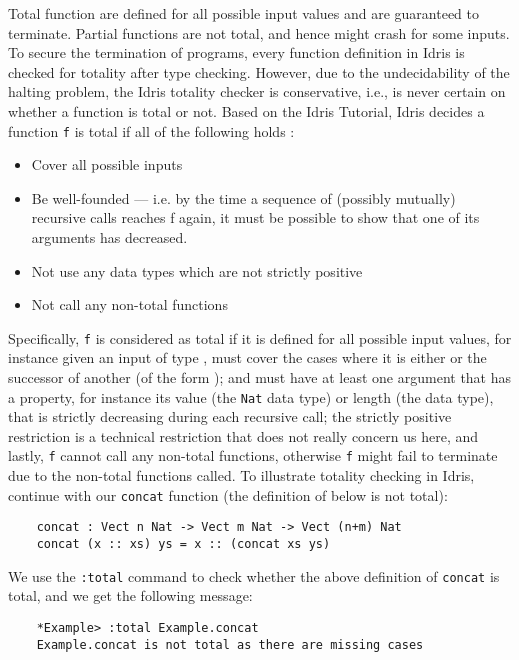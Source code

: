 Total function are defined for all possible input values and are guaranteed to terminate. Partial functions are not total, and hence might crash for some inputs. To secure the termination of programs, every function definition in Idris is checked for totality after type checking. However, due to the undecidability of the halting problem, the Idris totality checker is conservative, i.e., is never certain on whether a function is total or not. Based on the Idris Tutorial, Idris decides a function \texttt{f} is total if all of the following holds \cite{idris_tutorial}: 
\begin{itemize}
  \item Cover all possible inputs
  \item Be well-founded — i.e. by the time a sequence of (possibly mutually) recursive calls reaches f again, it must be possible to show that one of its arguments has decreased.
  \item Not use any data types which are not strictly positive
  \item Not call any non-total functions
\end{itemize}
Specifically, \texttt{f} is considered as total if it is defined for all possible input values, for instance given an input of type ,  must cover the cases where it is either  or the successor of another  (of the form ); and must have at least one argument that has a property, for instance its value (the \texttt{Nat} data type) or length (the  data type), that is strictly decreasing during each recursive call; the strictly positive restriction is a technical restriction that does not really concern us here, and lastly, \texttt{f} cannot call any non-total functions, otherwise \texttt{f} might fail to terminate due to the non-total functions called. To illustrate totality checking in Idris, continue with our \texttt{concat} function (the definition of  below is not total):
\begin{lstlisting}
    concat : Vect n Nat -> Vect m Nat -> Vect (n+m) Nat
    concat (x :: xs) ys = x :: (concat xs ys)
\end{lstlisting}

We use the \texttt{:total} command to check whether the above definition of \texttt{concat} is total, and we get the following message:
\begin{lstlisting}
    *Example> :total Example.concat
    Example.concat is not total as there are missing cases
\end{lstlisting}

